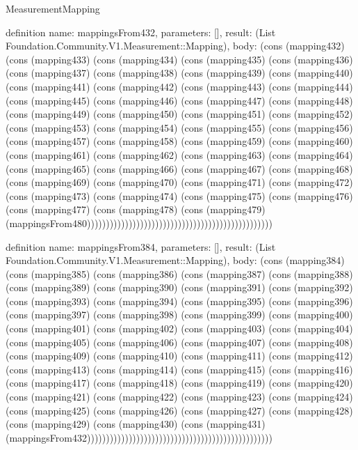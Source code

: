 \begin{lexlean}{MeasurementMapping}
\begin{semanticmodule}
definition{
  name: mappingsFrom432,
  parameters: [],
  result: (List Foundation.Community.V1.Measurement::Mapping),
  body: (cons (mapping432) (cons (mapping433) (cons (mapping434) (cons (mapping435) (cons (mapping436) (cons (mapping437) (cons (mapping438) (cons (mapping439) (cons (mapping440) (cons (mapping441) (cons (mapping442) (cons (mapping443) (cons (mapping444) (cons (mapping445) (cons (mapping446) (cons (mapping447) (cons (mapping448) (cons (mapping449) (cons (mapping450) (cons (mapping451) (cons (mapping452) (cons (mapping453) (cons (mapping454) (cons (mapping455) (cons (mapping456) (cons (mapping457) (cons (mapping458) (cons (mapping459) (cons (mapping460) (cons (mapping461) (cons (mapping462) (cons (mapping463) (cons (mapping464) (cons (mapping465) (cons (mapping466) (cons (mapping467) (cons (mapping468) (cons (mapping469) (cons (mapping470) (cons (mapping471) (cons (mapping472) (cons (mapping473) (cons (mapping474) (cons (mapping475) (cons (mapping476) (cons (mapping477) (cons (mapping478) (cons (mapping479) (mappingsFrom480)))))))))))))))))))))))))))))))))))))))))))))))))
}

definition{
  name: mappingsFrom384,
  parameters: [],
  result: (List Foundation.Community.V1.Measurement::Mapping),
  body: (cons (mapping384) (cons (mapping385) (cons (mapping386) (cons (mapping387) (cons (mapping388) (cons (mapping389) (cons (mapping390) (cons (mapping391) (cons (mapping392) (cons (mapping393) (cons (mapping394) (cons (mapping395) (cons (mapping396) (cons (mapping397) (cons (mapping398) (cons (mapping399) (cons (mapping400) (cons (mapping401) (cons (mapping402) (cons (mapping403) (cons (mapping404) (cons (mapping405) (cons (mapping406) (cons (mapping407) (cons (mapping408) (cons (mapping409) (cons (mapping410) (cons (mapping411) (cons (mapping412) (cons (mapping413) (cons (mapping414) (cons (mapping415) (cons (mapping416) (cons (mapping417) (cons (mapping418) (cons (mapping419) (cons (mapping420) (cons (mapping421) (cons (mapping422) (cons (mapping423) (cons (mapping424) (cons (mapping425) (cons (mapping426) (cons (mapping427) (cons (mapping428) (cons (mapping429) (cons (mapping430) (cons (mapping431) (mappingsFrom432)))))))))))))))))))))))))))))))))))))))))))))))))
}


\end{semanticmodule}
\end{lexlean}
